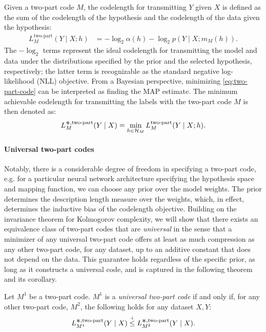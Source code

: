 Given a two-part code $M$, the codelength for transmitting $Y$ given $X$ is defined as the sum of the codelength of the hypothesis and the codelength of the data given the hypothesis:
\begin{align}
    L_{M}^{\text{two-part}}(Y \mid X;h) &= -\log_2 \alpha(h) -\log_2 p(Y \mid X;m_M(h)).
    \label{eq:two-part-code}
\end{align}
The $-\log_2$ terms represent the ideal codelength for transmitting the model and data under the distributions specified by the prior and the selected hypothesis, respectively; the latter term is recognizable as the standard negative log-likelihood (NLL) objective. From a Bayesian perspective, 
minimizing \eqref{eq:two-part-code} can be interpreted as finding the MAP estimate.
The minimum achievable codelength for transmitting the labels with the two-part code $M$ is then denoted as:
\begin{equation}
    L_M^{\bigast,\text{two-part}}(Y \mid X) = \min_{h \in \gH_M}
    L_M^{\text{two-part}}(Y \mid X;h).
    \label{eq:two-part-min}
\end{equation}

\paragraph{Universal two-part codes}

Notably, there is a considerable degree of freedom in specifying a two-part code, e.g. for a particular neural network architecture specifying the hypothesis space and mapping function, we can choose any prior over the model weights. The prior determines the description length measure over the weights, which, in effect, determines the inductive bias of the codelength objective.
Building on the invariance theorem for Kolmogorov complexity, we will show that there exists an equivalence class of two-part codes that are \emph{universal} in the sense that a minimizer of any universal two-part code offers at least as much compression as any other two-part code, for any dataset, up to an additive constant that does not depend on the data. This guarantee holds regardless of the specific prior, as long as it constructs a universal code, and is captured in the following theorem and its corollary.

\begin{defn}
Let $M^1$ be a two-part code. $M^1$ is a \emph{universal two-part code} if and only if, for any other two-part code, $M^2$, the following holds for any dataset $X,Y$:
\begin{equation}
L^{\bigast,\text{two-part}}_{M^1}(Y \mid X) \leqc L^{\bigast,\text{two-part}}_{M^2}(Y \mid X).
\end{equation}
\end{defn}

